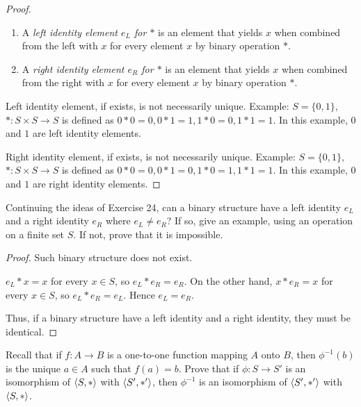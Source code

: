 \begin{proof}
    \begin{enumerate}[label={\textbf{\alph*.}},itemsep=0pt]
        \item A \textit{left identity element $e_{L}$ for $*$} is an element that yields $x$ when combined from the left with $x$ for every element $x$ by binary operation $*$.
        \item A \textit{right identity element $e_{R}$ for $*$} is an element that yields $x$ when combined from the right with $x$ for every element $x$ by binary operation $*$.
    \end{enumerate}

    Left identity element, if exists, is not necessarily unique. Example: $S = \{ 0, 1 \}$, $*: S\times S\to S$ is defined as $0 * 0 = 0, 0 * 1 = 1, 1 * 0 = 0, 1 * 1 = 1$. In this example, $0$ and $1$ are left identity elements.

    Right identity element, if exists, is not necessarily unique. Example: $S = \{ 0, 1 \}$, $*: S\times S\to S$ is defined as $0 * 0 = 0, 0 * 1 = 0, 1 * 0 = 1, 1 * 1 = 1$. In this example, $0$ and $1$ are right identity elements.
\end{proof}

\begin{exercise}
    Continuing the ideas of Exercise 24, can a binary structure have a left identity $e_{L}$ and a right identity $e_{R}$ where $e_{L}\ne e_{R}$? If so, give an example, using an operation on a finite set $S$. If not, prove that it is impossible.
\end{exercise}

\begin{proof}
    Such binary structure does not exist.

    $e_{L} * x = x$ for every $x\in S$, so $e_{L} * e_{R} = e_{R}$. On the other hand, $x * e_{R} = x$ for every $x\in S$, so $e_{L} * e_{R} = e_{L}$. Hence $e_{L} = e_{R}$.

    Thus, if a binary structure have a left identity and a right identity, they must be identical.
\end{proof}

\begin{exercise}
    Recall that if $f: A \to B$ is a one-to-one function mapping $A$ onto $B$, then $\phi^{-1}(b)$ is the unique $a\in A$ such that $f(a) = b$. Prove that if $\phi: S \to S'$ is an isomorphism of $\left\langle{S, *}\right\rangle$ with $\left\langle{S', *'}\right\rangle$, then $\phi^{-1}$ is an isomorphism of $\left\langle{S', *'}\right\rangle$ with $\left\langle{S, *}\right\rangle$.
\end{exercise}

